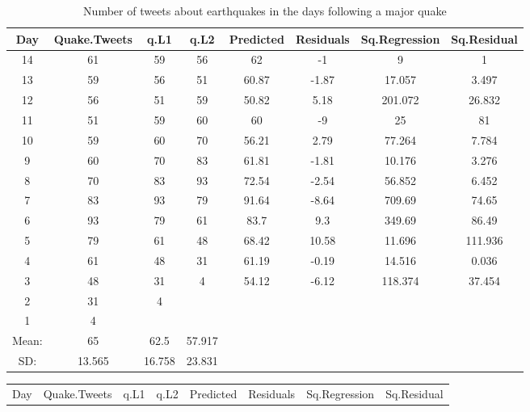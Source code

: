 \documentclass[11pt]{exam}
\begin{document}
\begin{questions}
\ifprintanswers
\begin{table}[ht]
\begin{center}
\begin{tabular}{|c|c|c|c|c|c|c|c|}
  \hline
Day & Quake.Tweets & q.L1 & q.L2 & Predicted & Residuals & Sq.Regression & Sq.Residual \\ 
  \hline
14 & 61 & 59 & 56 & 62 & -1 & 9 & 1 \\ 
   \hline
13 & 59 & 56 & 51 & 60.87 & -1.87 & 17.057 & 3.497 \\ 
   \hline
12 & 56 & 51 & 59 & 50.82 & 5.18 & 201.072 & 26.832 \\ 
   \hline
11 & 51 & 59 & 60 & 60 & -9 & 25 & 81 \\ 
   \hline
10 & 59 & 60 & 70 & 56.21 & 2.79 & 77.264 & 7.784 \\ 
   \hline
9 & 60 & 70 & 83 & 61.81 & -1.81 & 10.176 & 3.276 \\ 
   \hline
8 & 70 & 83 & 93 & 72.54 & -2.54 & 56.852 & 6.452 \\ 
   \hline
7 & 83 & 93 & 79 & 91.64 & -8.64 & 709.69 & 74.65 \\ 
   \hline
6 & 93 & 79 & 61 & 83.7 & 9.3 & 349.69 & 86.49 \\ 
   \hline
5 & 79 & 61 & 48 & 68.42 & 10.58 & 11.696 & 111.936 \\ 
   \hline
4 & 61 & 48 & 31 & 61.19 & -0.19 & 14.516 & 0.036 \\ 
   \hline
3 & 48 & 31 & 4 & 54.12 & -6.12 & 118.374 & 37.454 \\ 
   \hline
2 & 31 & 4 &  &  &  &  &  \\ 
   \hline
1 & 4 &  &  &  &  &  &  \\ 
   \hline
Mean: & 65 & 62.5 & 57.917 &  &  &  &  \\ 
   \hline
SD: & 13.565 & 16.758 & 23.831 &  &  &  &  \\ 
   \hline
\end{tabular}
\caption{Number of tweets about earthquakes in the days following a major quake}
\label{tab:quake}
\end{center}
\end{table}\else 
\begin{table}[ht]
\begin{center}
\begin{tabular}{|c|c|c|c|c|c|c|c|}
  \hline
Day & Quake.Tweets & q.L1 & q.L2 & Predicted & Residuals & Sq.Regression & Sq.Residual \\ 

\end{tabular}
\end{center}
\end{table}
\end{questions}
\end{document}

